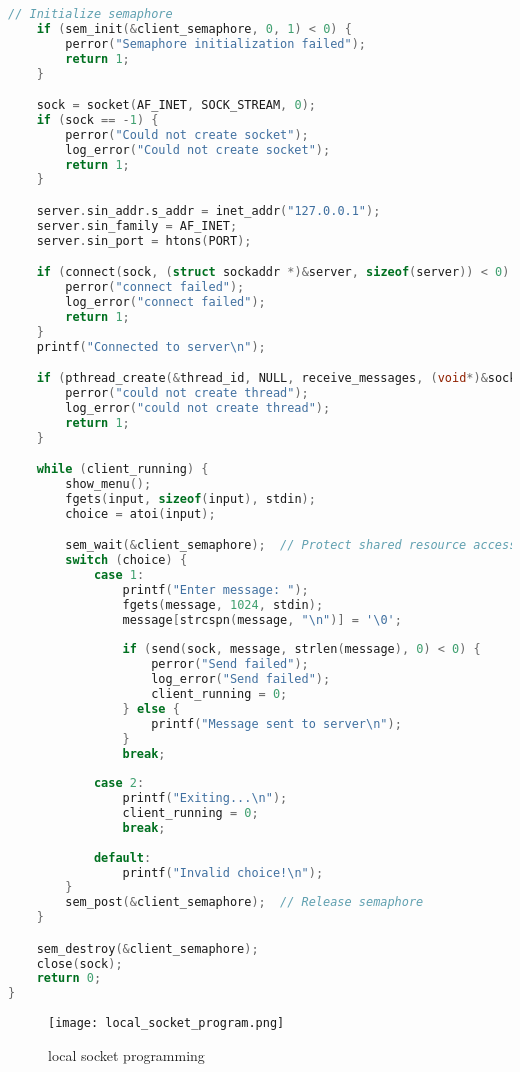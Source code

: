 \documentclass{article}
\begin{document}
\begin{lstlisting}[language=C, caption= client code - Socket Programming Code]
    // Initialize semaphore
    if (sem_init(&client_semaphore, 0, 1) < 0) {
        perror("Semaphore initialization failed");
        return 1;
    }

    sock = socket(AF_INET, SOCK_STREAM, 0);
    if (sock == -1) {
        perror("Could not create socket");
        log_error("Could not create socket");
        return 1;
    }

    server.sin_addr.s_addr = inet_addr("127.0.0.1");
    server.sin_family = AF_INET;
    server.sin_port = htons(PORT);

    if (connect(sock, (struct sockaddr *)&server, sizeof(server)) < 0) {
        perror("connect failed");
        log_error("connect failed");
        return 1;
    }
    printf("Connected to server\n");

    if (pthread_create(&thread_id, NULL, receive_messages, (void*)&sock) < 0) {
        perror("could not create thread");
        log_error("could not create thread");
        return 1;
    }

    while (client_running) {
        show_menu();
        fgets(input, sizeof(input), stdin);
        choice = atoi(input);

        sem_wait(&client_semaphore);  // Protect shared resource access
        switch (choice) {
            case 1:
                printf("Enter message: ");
                fgets(message, 1024, stdin);
                message[strcspn(message, "\n")] = '\0';
                
                if (send(sock, message, strlen(message), 0) < 0) {
                    perror("Send failed");
                    log_error("Send failed");
                    client_running = 0;
                } else {
                    printf("Message sent to server\n");
                }
                break;
                
            case 2:
                printf("Exiting...\n");
                client_running = 0;
                break;
                
            default:
                printf("Invalid choice!\n");
        }
        sem_post(&client_semaphore);  // Release semaphore
    }

    sem_destroy(&client_semaphore);
    close(sock);
    return 0;
}
\end{lstlisting}

\begin{figure}[H]
    \centering
    \texttt{[image: local\_socket\_program.png]}
    \caption{local socket programming}
    \label{fig:SP}
\end{figure}
\end{document}

